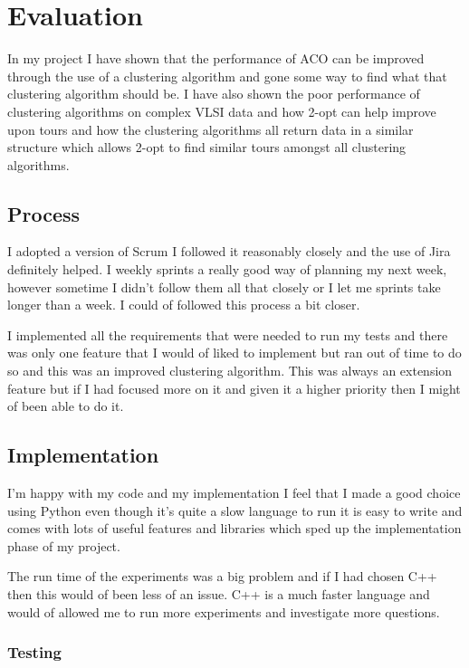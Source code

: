 \chapter{Evaluation}

In my project I have shown that the performance of ACO can be improved through the use of a clustering algorithm and gone some way to find what that clustering algorithm should be. I have also shown the poor performance of clustering algorithms on complex VLSI data and how 2-opt can help improve upon tours and how the clustering algorithms all return data in a similar structure which allows 2-opt to find similar tours amongst all clustering algorithms.

\section{Process}

I adopted a version of Scrum I followed it reasonably closely and the use of Jira definitely helped. I weekly sprints a really good way of planning my next week, however sometime I didn't follow them all that closely or I let me sprints take longer than a week. I could of followed this process a bit closer. 

I implemented all the requirements that were needed to run my tests and there was only one feature that I would of liked to implement but ran out of time to do so and this was an improved clustering algorithm. This was always an extension feature but if I had focused more on it and given it a higher priority then I might of been able to do it. 

\section{Implementation}

I'm happy with my code and my implementation I feel that I made a good choice using Python even though it's quite a slow language to run it is easy to write and comes with lots of useful features and libraries which sped up the implementation phase of my project.

The run time of the experiments was a big problem and if I had chosen C++ then this would of been less of an issue. C++ is a much faster language and would of allowed me to run more experiments and investigate more questions.

\subsection{Testing}

